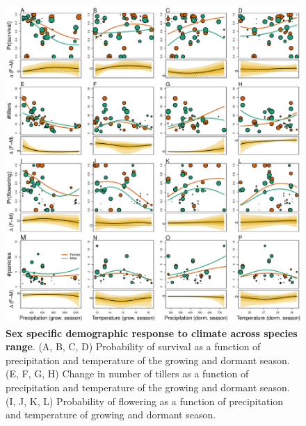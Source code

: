 \documentclass[12pt]{article}\usepackage[]{graphicx}\usepackage[dvipsnames]{xcolor}
\begin{document}

\begin{figure}[H]
  \begin{center}
    \includegraphics[width=0.80\linewidth]{Figures/vital_rates.pdf}
  \caption{\textbf{Sex specific demographic response to climate across species range}.
  (A, B, C, D) Probability of survival as a function of precipitation and temperature of the growing and dormant season.
  (E, F, G, H) Change in number of tillers as a function of precipitation and temperature of the growing and dormant season.
  (I, J, K, L) Probability of flowering as a function of precipitation and temperature of growing and dormant season.
}
\end{center}
\end{figure}
\end{document}
